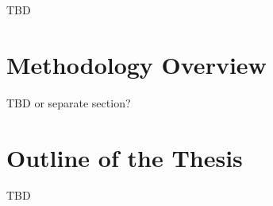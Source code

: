 TBD

\section{Methodology Overview}
\label{sec:methodology_overview}

TBD or separate section?

\section{Outline of the Thesis}
\label{sec:outline}

TBD